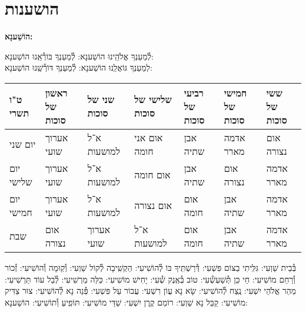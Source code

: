 \documentclass[twoside, openany, parskip=half, 11pt]{book}
\begin{document}
\sepline





\chapter[הושענות]{ הושענות }
\label{hoshanos}


\begin{Large}
\textbf{
הוֹשַׁענָא:
}
\end{Large}


לְ֯מַעַנְךָ אֱלֹהֵֽינוּ הוֹשַׁענָא: לְ֯מַעַנְךָ בּוֹרְ֯אֵֽנוּ הוֹשַׁענָא:\\
לְמַעַנְךָ גּוֹאֲלֵֽנוּ הוֹשַׁענָא: לְ֯מַעַנְךָ דּוֹרְ֯שֵֽׁנוּ הוֹשַׁענָא:

\begin{tiny}
\begin{tabular}{>{\centering\arraybackslash}m{}||>{\centering\arraybackslash}m{}|>{\centering\arraybackslash}m{}|>{\centering\arraybackslash}m{}|>{\centering\arraybackslash}m{}|>{\centering\arraybackslash}m{}|>{\centering\arraybackslash}m{}}
ט"ו תשרי & ראשון של סוכות & שני של סוכות & שלישי של סוכות & רביעי של סוכות & חמישי של סוכות & ששי של סוכות \\
\hline \hline
יום שני & אערוך שועי & א־ל למושעות & אום אני חומה & אבן שתיה & אדמה מארר & אום נצורה\\ \hline
יום שלישי & אערוך שועי & א־ל למושעות & אום חומה & אבן שתיה & אום נצורה & אדמה מארר \\ \hline
יום חמישי & אערוך שועי & א־ל למושעות & אום נצורה & אום חומה & אבן שתיה & אדמה מארר\\ \hline
שבת & אום נצורה & אערוך שועי & א־ל למושעות & אום חומה & אבן שתיה & אדמה מארר
\end{tabular}

\end{tiny}


בְּ֯בֵית שַׁוְעִי: גִּלִּֽיתִי בַצּוֹם פִּשְׁעִי: דְּ֯רַשְׁתִּֽיךָ בּוֹ לְ֯הוֹשִׁיעִי: הַקְשִֽׁיבָה לְ֯קוֹל שַׁוְעִי: וְ֯קֽוּמָה וְ֯הוֹשִׁיעִי: זְ֯כוֹר וְ֯רַחֵם מוֹשִׁיעִי: חַי כֵּן תְּ֯שַׁעְשְׁ֯עִי: טוֹב בְּ֯אֶֽנֶק שְׁ֯עִי: יָחִישׁ מוֹשִׁיעִי: כַּלֵּה מַרְשִׁיעִי: לְ֯בַל עוֹד תַּרְשִׁיעִי: מַהֵר אֱלֹהֵי יִשְׁעִי: נֶֽצַח לְ֯הוֹשִׁיעִי: שָׂא נָא עֲוֹן רִשְׁעִי: עֲבוֹר עַל פִּשְׁעִי: פְּ֯נֵה נָא לְ֯הוֹשִׁיעִי: צוּר צַדִּיק מוֹשִׁיעִי: קַבֵּל נָא שַׁוְעִי: רוֹמֵם קֶֽרֶן יִשְׁעִי:
שַׁדַּי מוֹשִׁיעִי: תּוֹפִֽיעַ וְ֯תוֹשִׁיעִי: הוֹשַׁענָא:

\end{document}
